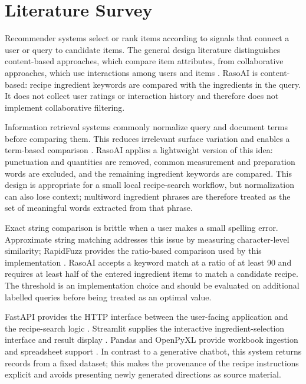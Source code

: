 \documentclass[12pt,a4paper]{report}
\begin{document}
\chapter{Literature Survey}
\label{chap:literature}

Recommender systems select or rank items according to signals that connect a user or query to candidate items. The general design literature distinguishes content-based approaches, which compare item attributes, from collaborative approaches, which use interactions among users and items \cite{recsys}. RasoAI is content-based: recipe ingredient keywords are compared with the ingredients in the query. It does not collect user ratings or interaction history and therefore does not implement collaborative filtering.

Information retrieval systems commonly normalize query and document terms before comparing them. This reduces irrelevant surface variation and enables a term-based comparison \cite{ir}. RasoAI applies a lightweight version of this idea: punctuation and quantities are removed, common measurement and preparation words are excluded, and the remaining ingredient keywords are compared. This design is appropriate for a small local recipe-search workflow, but normalization can also lose context; multiword ingredient phrases are therefore treated as the set of meaningful words extracted from that phrase.

Exact string comparison is brittle when a user makes a small spelling error. Approximate string matching addresses this issue by measuring character-level similarity; RapidFuzz provides the ratio-based comparison used by this implementation \cite{rapidfuzz}. RasoAI accepts a keyword match at a ratio of at least 90 and requires at least half of the entered ingredient items to match a candidate recipe. The threshold is an implementation choice and should be evaluated on additional labelled queries before being treated as an optimal value.

FastAPI provides the HTTP interface between the user-facing application and the recipe-search logic \cite{fastapi}. Streamlit supplies the interactive ingredient-selection interface and result display \cite{streamlit}. Pandas and OpenPyXL provide workbook ingestion and spreadsheet support \cite{pandas,openpyxl}. In contrast to a generative chatbot, this system returns records from a fixed dataset; this makes the provenance of the recipe instructions explicit and avoids presenting newly generated directions as source material.
\end{document}
